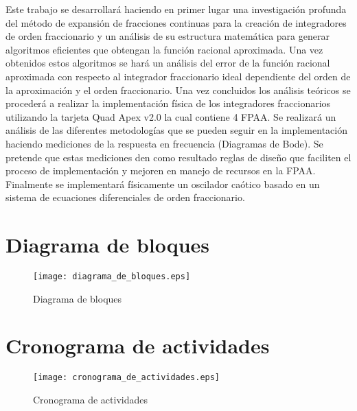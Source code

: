	Este trabajo se desarrollará haciendo en primer lugar una investigación profunda del método de expansión de fracciones continuas para la creación de integradores de orden fraccionario y un análisis de su estructura matemática para generar algoritmos eficientes que obtengan la función racional aproximada. Una vez obtenidos estos algoritmos se hará un análisis del error de la función racional aproximada con respecto al integrador fraccionario ideal dependiente del orden de la aproximación y el orden fraccionario. Una vez concluidos los análisis teóricos se procederá a realizar la implementación física de los integradores fraccionarios utilizando la tarjeta Quad Apex v2.0 la cual contiene 4 FPAA. Se realizará un análisis de las diferentes metodologías que se pueden seguir en la implementación haciendo mediciones de la respuesta en frecuencia (Diagramas de Bode). Se pretende que estas mediciones den como resultado reglas de diseño que faciliten el proceso de implementación y mejoren en manejo de recursos en la FPAA. Finalmente se implementará físicamente un oscilador caótico basado en un sistema de ecuaciones diferenciales de orden fraccionario.
	
	\newpage
	\section{Diagrama de bloques}	
	\begin{figure}[hbtp]
	\centering
	\texttt{[image: diagrama\_de\_bloques.eps]}
	\caption{Diagrama de bloques}
	\end{figure}
	
	\section{Cronograma de actividades}
	\begin{figure}[hbtp]
	\centering
	\texttt{[image: cronograma\_de\_actividades.eps]}
	\caption{Cronograma de actividades}
	\end{figure}	
		
		
	
	
	
	